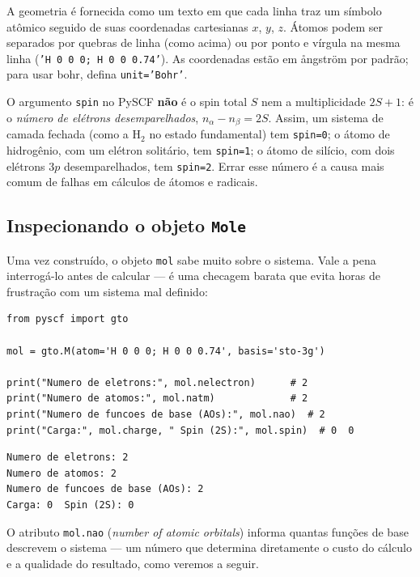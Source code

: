 \documentclass[11pt,a4paper,openany]{book}
\newcommand{\code}[1]{\texttt{#1}}
\newcommand{\pyscf}{\textsf{PySCF}}
\begin{document}
A geometria é fornecida como um texto em que cada linha traz um símbolo atômico
seguido de suas coordenadas cartesianas $x$, $y$, $z$. Átomos podem ser separados
por quebras de linha (como acima) ou por ponto e vírgula na mesma linha
(\code{'H 0 0 0; H 0 0 0.74'}). As coordenadas estão em ångström por padrão;
para usar bohr, defina \code{unit='Bohr'}.

\begin{caixaatencao}
O argumento \code{spin} no \pyscf{} \textbf{não} é o spin total $S$ nem a
multiplicidade $2S+1$: é o \emph{número de elétrons desemparelhados},
$n_\alpha - n_\beta = 2S$. Assim, um sistema de camada fechada (como a H$_2$ no
estado fundamental) tem \code{spin=0}; o átomo de hidrogênio, com um elétron
solitário, tem \code{spin=1}; o átomo de silício, com dois elétrons $3p$
desemparelhados, tem \code{spin=2}. Errar esse número é a causa mais comum de
falhas em cálculos de átomos e radicais.
\end{caixaatencao}

\subsection{Inspecionando o objeto \code{Mole}}

Uma vez construído, o objeto \code{mol} sabe muito sobre o sistema. Vale a pena
interrogá-lo antes de calcular --- é uma checagem barata que evita horas de
frustração com um sistema mal definido:

\begin{lstlisting}[style=python,caption={Interrogando o objeto \code{Mole}.},label={lst:moleinspect}]
from pyscf import gto

mol = gto.M(atom='H 0 0 0; H 0 0 0.74', basis='sto-3g')

print("Numero de eletrons:", mol.nelectron)      # 2
print("Numero de atomos:", mol.natm)             # 2
print("Numero de funcoes de base (AOs):", mol.nao)  # 2
print("Carga:", mol.charge, " Spin (2S):", mol.spin)  # 0  0
\end{lstlisting}

\begin{lstlisting}[style=console]
Numero de eletrons: 2
Numero de atomos: 2
Numero de funcoes de base (AOs): 2
Carga: 0  Spin (2S): 0
\end{lstlisting}

\noindent
O atributo \code{mol.nao} (\emph{number of atomic orbitals}) informa quantas
funções de base descrevem o sistema --- um número que determina diretamente o
custo do cálculo e a qualidade do resultado, como veremos a seguir.
\end{document}
